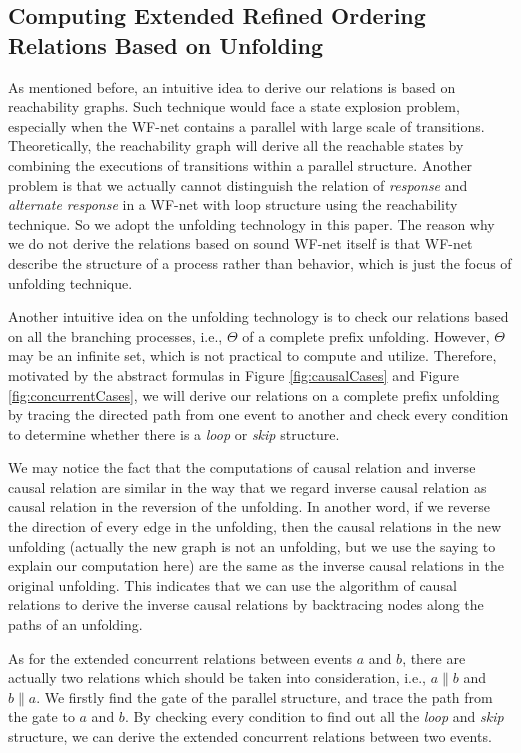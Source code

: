 \documentclass{llncs}
\begin{document}
\subsection{Computing Extended Refined Ordering Relations Based on Unfolding}\label{subsec:computationOfRelations}
As mentioned before, an intuitive idea to derive our relations is based on reachability graphs. Such technique would face a state explosion problem, especially when the WF-net contains a parallel with large scale of transitions. Theoretically, the reachability graph will derive all the reachable states by combining the executions of transitions within a parallel structure. Another problem is that we actually cannot distinguish the relation of \textit{response} and \textit{alternate response} in a WF-net with loop structure using the reachability technique. So we adopt the unfolding technology in this paper. The reason why we do not derive the relations based on sound WF-net itself is that WF-net describe the structure of a process rather than behavior, which is just the focus of unfolding technique.

Another intuitive idea on the unfolding technology is to check our relations based on all the branching processes, i.e., $\Theta$ of a complete prefix unfolding. However, $\Theta$ may be an infinite set, which is not practical to compute and utilize. Therefore, motivated by the abstract formulas in Figure \ref{fig:causalCases} and Figure \ref{fig:concurrentCases}, we will derive our relations on a complete prefix unfolding by tracing the directed path from one event to another and check every condition to determine whether there is a \textit{loop} or \textit{skip} structure.

We may notice the fact that the computations of causal relation and inverse causal relation are similar in the way that we regard inverse causal relation as causal relation in the reversion of the unfolding. In another word, if we reverse the direction of every edge in the unfolding, then the causal relations in the new unfolding (actually the new graph is not an unfolding, but we use the saying to explain our computation here) are the same as the inverse causal relations in the original unfolding. This indicates that we can use the algorithm of causal relations to derive the inverse causal relations by backtracing nodes along the paths of an unfolding.

As for the extended concurrent relations between events $a$ and $b$, there are actually two relations which should be taken into consideration, i.e., $a\parallel b$ and $b\parallel a$. We firstly find the gate of the parallel structure, and trace the path from the gate to $a$ and $b$. By checking every condition to find out all the \textit{loop} and \textit{skip} structure, we can derive the extended concurrent relations between two events.
\end{document}
